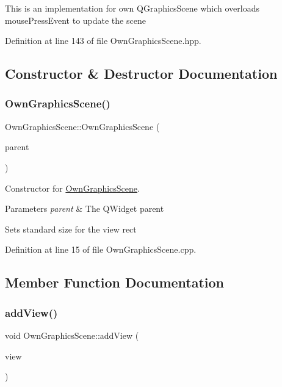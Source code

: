 This is an implementation for own Q\+Graphics\+Scene which overloads mouse\+Press\+Event to update the scene 

Definition at line 143 of file Own\+Graphics\+Scene.\+hpp.



\subsection{Constructor \& Destructor Documentation}
\mbox{\label{classOwnGraphicsScene_a242b82147a469314e4c7fb5af69c265f}} 
\subsubsection{\texorpdfstring{Own\+Graphics\+Scene()}{OwnGraphicsScene()}}
{\footnotesize\ttfamily Own\+Graphics\+Scene\+::\+Own\+Graphics\+Scene (\begin{DoxyParamCaption}\item[{Q\+Widget $\ast$}]{parent }\end{DoxyParamCaption})}



Constructor for \mbox{\hyperlink{classOwnGraphicsScene}{Own\+Graphics\+Scene}}. 


\begin{DoxyParams}{Parameters}
{\em parent} & The Q\+Widget parent\\
\hline
\end{DoxyParams}
Sets standard size for the view rect 

Definition at line 15 of file Own\+Graphics\+Scene.\+cpp.



\subsection{Member Function Documentation}
\mbox{\label{classOwnGraphicsScene_a8677d9cbb1f01943c303be0985c84fbe}} 
\subsubsection{\texorpdfstring{add\+View()}{addView()}}
{\footnotesize\ttfamily void Own\+Graphics\+Scene\+::add\+View (\begin{DoxyParamCaption}\item[{\mbox{\hyperlink{classOwnGraphicsView}{Own\+Graphics\+View}} $\ast$}]{view }\end{DoxyParamCaption})}




